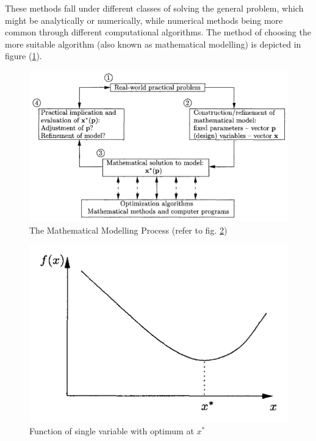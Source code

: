 These methods fall under different classes of solving the general problem, which might be analytically or numerically, while numerical methods being more common through different computational algorithms. The method of choosing the more suitable algorithm (also known as mathematical modelling) is depicted in figure (\ref{fig:MathModProc}).

\begin{figure}[htpb]
\centering
\includegraphics[width=\textwidth]{./Images/18-MathModProc}
\caption[Mathematical Modelling]{The Mathematical Modelling Process (refer to fig. \ref{fig:FunctionOpt}) \cite{snyman05}}
\label{fig:MathModProc}
\end{figure}

\begin{figure}
\centering
\includegraphics[width=17cm]{./Images/19-FunctionOpt}
\caption[Function of Single Variable]{Function of single variable with optimum at $x^*$ \cite{snyman05}}
\label{fig:FunctionOpt}
\end{figure}

